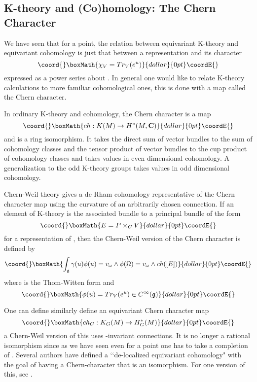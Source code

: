 \documentclass[a4paper,a4paper]{article}
\theoremstyle{conjecture}
\begin{document}
\subsection{K-theory and (Co)homology: The Chern Character}

We have seen that for a point, the relation between equivariant K-theory and equivariant
cohomology is just that between a representation \coordHE{} and its character
$$\coord{}\boxMath{\chi_V=Tr_V(e^u)}{dollar}{0pt}\coordE{}$$
expressed as a power series about \coordHE{}.  In general one would like to
relate K-theory calculations to more familiar cohomological ones, this is done with
a map called the Chern character.

In ordinary K-theory and cohomology, the Chern character is a map
$$\coord{}\boxMath{ch:K(M)\rightarrow H^*(M,\mathbf C)}{dollar}{0pt}\coordE{}$$
and is a ring isomorphism. It takes the direct sum of vector bundles to the sum
of cohomology classes and the tensor product of vector bundles to the cup product
of cohomology classes and takes values in even dimensional cohomology. A generalization to
the odd K-theory groups takes values in odd dimensional cohomology.  


Chern-Weil theory gives a de Rham cohomology representative
of the Chern character map using the curvature of an arbitrarily chosen connection.
If an element \myHighlight{$[E]$}\coordHE{} of K-theory is the associated bundle to a principal bundle \coordHE{}
of the form 
$$\coord{}\boxMath{E=P\times _G V}{dollar}{0pt}\coordE{}$$
for a representation \coordHE{} of \coordHE{}, then the Chern-Weil version of the Chern character
is defined by
$$\coord{}\boxMath{\int_{\mathfrak g} \gamma (u)\phi(u)= v_\omega \wedge \phi(\Omega)=v_\omega \wedge ch([E])}{dollar}{0pt}\coordE{}$$
where \myHighlight{$\gamma$}\coordHE{} is the Thom-Witten form and 
$$\coord{}\boxMath{\phi(u)=Tr_V(e^u)\in C^\infty(\mathfrak g)}{dollar}{0pt}\coordE{}$$

One can define similarly define an equivariant Chern character map
$$\coord{}\boxMath{ch_G:K_G(M)\rightarrow H^*_G(M)}{dollar}{0pt}\coordE{}$$
a Chern-Weil version of this uses \coordHE{}-invariant connections.
It is no longer a rational isomorphism since as we have seen even for a point
one has to take a completion of \coordHE{}.  Several authors have defined a
\lq\lq de-localized equivariant cohomology" with the goal of having a 
Chern-character that is an isomorphism. For one version of this, see \cite{Duflo-Vergne}.
\end{document}
